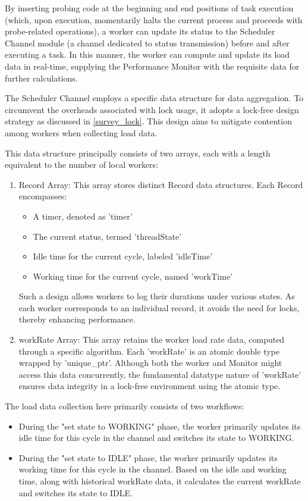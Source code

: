 \documentclass{mproj}
\begin{document}
By inserting probing code at the beginning and end positions of task execution
(which, upon execution, momentarily halts the current process and proceeds with probe-related operations),
a worker can update its status to the Scheduler Channel module (a channel dedicated to status transmission)
before and after executing a task.
In this manner, the worker can compute and update its load data in real-time,
supplying the Performance Monitor with the requisite data for further calculations.

The Scheduler Channel employs a specific data structure for data aggregation.
To circumvent the overheads associated with lock usage,
it adopts a lock-free design strategy as discussed in \ref{survey_lock}.
This design aims to mitigate contention among workers when collecting load data.

This data structure principally consists of two arrays, each with a length equivalent to the number of local workers:
\begin{enumerate}
    \item Record Array: This array stores distinct Record data structures. Each Record encompasses:
          \begin{itemize}
              \item A timer, denoted as 'timer'
              \item The current status, termed 'threadState'
              \item Idle time for the current cycle, labeled 'idleTime'
              \item Working time for the current cycle, named 'workTime'
          \end{itemize}
          Such a design allows workers to log their durations under various states.
          As each worker corresponds to an individual record,
          it avoids the need for locks, thereby enhancing performance.
    \item workRate Array: This array retains the worker load rate data, computed through a specific algorithm.
          Each 'workRate' is an atomic double type wrapped by 'unique\_ptr'.
          Although both the worker and Monitor might access this data concurrently,
          the fundamental datatype nature of 'workRate' ensures data integrity in a lock-free environment using the atomic type.
\end{enumerate}

The load data collection here primarily consists of two workflows:
\begin{itemize}
    \item During the "set state to WORKING" phase,
          the worker primarily updates its idle time for this cycle in the channel and switches its state to WORKING.
    \item During the "set state to IDLE" phase,
          the worker primarily updates its working time for this cycle in the channel.
          Based on the idle and working time, along with historical workRate data,
          it calculates the current workRate and switches its state to IDLE.
\end{itemize}
\end{document}
